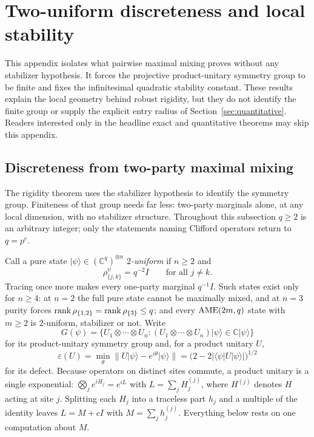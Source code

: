 \section{Two-uniform discreteness and local stability}
\label{sec:two-uniform}

This appendix isolates what pairwise maximal mixing proves without any
stabilizer hypothesis.  It forces the projective product-unitary symmetry
group to be finite and fixes the infinitesimal quadratic stability constant.
These results explain the local geometry behind robust rigidity, but they do
not identify the finite group or supply the explicit entry radius of
Section~\ref{sec:quantitative}.  Readers interested only in the headline
exact and quantitative theorems may skip this appendix.

\subsection{Discreteness from two-party maximal mixing}

The rigidity theorem uses the stabilizer hypothesis to identify the
symmetry group.  Finiteness of that group needs far less: two-party
marginals alone, at any local dimension, with no stabilizer structure.
Throughout this subsection \(q\geq2\) is an arbitrary integer; only the
statements naming Clifford operators return to \(q=p^e\).

Call a pure state
\(\lvert\psi\rangle\in(\mathbb C^q)^{\otimes n}\) \emph{\(2\)-uniform} if \(n\geq2\) and
\[
 \rho^\psi_{\{j,k\}}=q^{-2}I\qquad\text{for all }j\ne k .
\]
Tracing once more makes every one-party marginal \(q^{-1}I\).  Such states
exist only for \(n\geq4\): at \(n=2\) the full pure state cannot be
maximally mixed, and at \(n=3\) purity forces
\(\operatorname{rank}\rho_{\{1,2\}}=\operatorname{rank}\rho_{\{3\}}\leq q\); and every
\(\mathrm{AME}(2m,q)\) state with \(m\geq2\) is \(2\)-uniform, stabilizer or not.
Write
\[
 G(\psi)=\{U_1\otimes\cdots\otimes U_n:
   (U_1\otimes\cdots\otimes U_n)\lvert\psi\rangle
     \in\mathbb C\lvert\psi\rangle\}
\]
for its product-unitary symmetry group and, for a product unitary \(U\),
\[
 \varepsilon(U)=\min_\theta\bigl\lVert U\lvert\psi\rangle
    -e^{i\theta}\lvert\psi\rangle\bigr\rVert
  =\bigl(2-2\lvert\langle\psi\rvert U\lvert\psi\rangle\rvert
   \bigr)^{1/2}
\]
for its defect.  Because operators on distinct sites commute, a product
unitary is a single exponential:
\(\bigotimes_je^{iH_j}=e^{iL}\) with \(L=\sum_jH_j^{(j)}\), where
\(H^{(j)}\) denotes \(H\) acting at site \(j\).  Splitting each \(H_j\)
into a traceless part \(h_j\) and a multiple of the identity leaves
\(L=M+cI\) with \(M=\sum_jh_j^{(j)}\).  Everything below rests on one
computation about \(M\).


